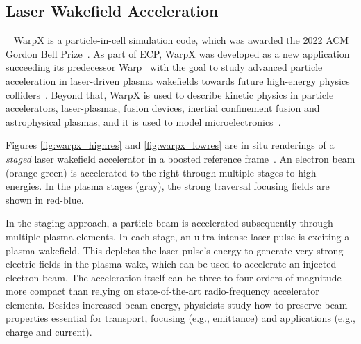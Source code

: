 \subsection{Laser Wakefield Acceleration}\label{sec:warpx}

~%
%
%
WarpX is a particle-in-cell simulation code, which was awarded the 2022 ACM Gordon Bell Prize~\cite{FedeliHuebl2022}.
As part of ECP, WarpX was developed as a new application succeeding its predecessor Warp~\cite{Vay2013} with the goal to study advanced particle acceleration in laser-driven plasma wakefields towards future high-energy physics colliders~\cite{Albert2021}.
Beyond that, WarpX is used to describe kinetic physics in particle accelerators, laser-plasmas, fusion devices, inertial confinement fusion and astrophysical plasmas, and it is used to model microelectronics~\cite{Yao2022}.

Figures \ref{fig:warpx_highres} and \ref{fig:warpx_lowres} are in situ renderings of a \emph{staged} laser wakefield accelerator in a boosted reference frame~\cite{Vay2011}.
An electron beam (orange-green) is accelerated to the right through multiple stages to high energies.
In the plasma stages (gray), the strong traversal focusing fields are shown in red-blue.

In the staging approach, a particle beam is accelerated subsequently through multiple plasma elements.
In each stage, an ultra-intense laser pulse is exciting a plasma wakefield.
This depletes the laser pulse's energy to generate very strong electric fields in the plasma wake, which can be used to accelerate an injected electron beam.
The acceleration itself can be three to four orders of magnitude more compact than relying on state-of-the-art radio-frequency accelerator elements.
Besides increased beam energy, physicists study how to preserve beam properties essential for transport, focusing (e.g., emittance) and applications (e.g., charge and current).

